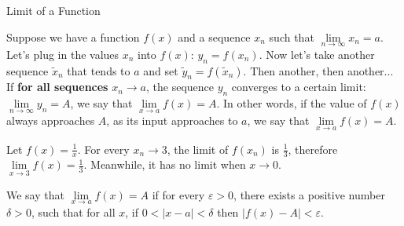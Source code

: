 \documentclass{beamer}
\begin{document}
\begin{frame}{Limit of a Function}

Suppose we have a function $f(x)$ and a sequence $x_n$ such that $\lim\limits_{n\to\infty} x_n = a$. Let's plug in the values $x_n$ into $f(x)$: $y_n = f(x_n)$.
\pause  Now let's take another sequence $\tilde{x}_n$ that tends to $a$ and set $\tilde{y}_n=f(\tilde{x}_n)$. \pause Then another, then another... \pause If \textbf{for all sequences} $x_n\to a$, the sequence $y_n$ converges to a certain limit: $\lim\limits_{n\to\infty} y_n =A$, we say that $\lim\limits_{x\to a} f(x) = A$.
\pause \newline In other words, if the value of $f(x)$ always approaches $A$, as its input approaches to $a$, we say that $\lim\limits_{x\to a} f(x) = A$.

\pause

\begin{example}
Let $f(x) = \frac{1}{x}$. For every $x_n \to 3$, the limit of $f(x_n)$ is $\frac{1}{3}$, therefore $\lim\limits_{x\to 3} f(x)=\frac{1}{3}$. Meanwhile, it has no limit when $x\to 0$.
\end{example} \pause
\begin{definition}
    We say that $\lim\limits_{x\to a}f(x)=A$ if for every $\varepsilon>0$, there exists a positive number $\delta>0$, such that for all $x$, if $0<|x-a|<\delta$ then $|f(x)-A| < \varepsilon.$
\end{definition}

\end{frame}
\end{document}
